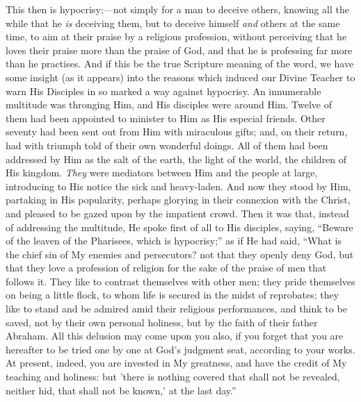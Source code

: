This then is hypocrisy;—not simply for a man to
deceive others, knowing all the while that he \emph{is}
deceiving them, but to deceive himself \emph{and} others
at the same time, to aim at their praise by a religious
profession, without perceiving that he loves their praise
more than the praise of God, and that he is professing
far more than he practises. And if this be the true
Scripture meaning of the word, we have some insight (as
it appears) into the reasons which induced our Divine
Teacher to warn His Disciples in so marked a way against
hypocrisy. An innumerable multitude was thronging Him,
and His disciples were around Him. Twelve of them had
been appointed to minister to Him as His especial
friends. Other seventy had been sent out from Him with
miraculous gifts; and, on their return, had with triumph
told of their own wonderful doings. All of them had been
addressed by Him as the salt of the earth, the light of
the world, the children of His kingdom. \emph{They} were
mediators between Him and the people at large,
introducing to His notice the sick and heavy-laden. And
now they stood by Him, partaking in His popularity,
perhaps glorying in their connexion with the Christ, and
pleased to be gazed upon by the impatient crowd. Then it
was that, instead of addressing the multitude, He spoke
first of all to His disciples, saying, ``Beware of
the leaven of the Pharisees, which is hypocrisy;'' as
if He had said, ``What is the chief sin of My enemies
and persecutors? not that they openly deny God, but that
they love a profession of religion for the sake of the
praise of men that follows it. They like to contrast
themselves with other men; they pride themselves on being
a little flock, to whom life is secured in the midst of
reprobates; they like to stand and be admired amid their
religious performances, and think to be saved, not by
their own personal holiness, but by the faith of their
father Abraham. All this delusion may come upon you also,
if you forget that you are hereafter to be tried one by
one at God's judgment seat, according to your works. At
present, indeed, you are invested in My greatness, and
have the credit of My teaching and holiness: but 'there
is nothing covered that shall not be revealed, neither
hid, that shall not be known,' at the last day.''

